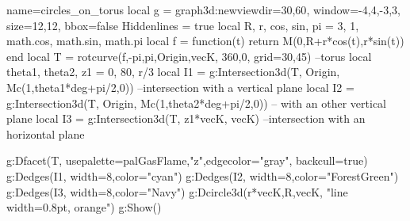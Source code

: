 \documentclass[border=5pt]{standalone}%
\begin{document}
\begin{luadraw}{name=circles_on_torus}
local g = graph3d:new{viewdir={30,60}, window={-4,4,-3,3}, size={12,12}, bbox=false}
Hiddenlines = true
local R, r, cos, sin, pi = 3, 1, math.cos, math.sin, math.pi
local f = function(t) return M(0,R+r*cos(t),r*sin(t)) end
local T = rotcurve(f,-pi,pi,{Origin,vecK}, 360,0, {grid={30,45}}) --torus
local theta1, theta2, z1 = 0, 80, r/3 
local I1 = g:Intersection3d(T, {Origin, Mc(1,theta1*deg+pi/2,0)}) --intersection with a vertical plane
local I2 = g:Intersection3d(T, {Origin, Mc(1,theta2*deg+pi/2,0)}) -- with an other vertical plane
local I3 = g:Intersection3d(T, {z1*vecK, vecK}) --intersection with an horizontal plane

g:Dfacet(T, {usepalette={palGasFlame,"z"},edgecolor="gray", backcull=true})
g:Dedges(I1, {width=8,color="cyan"})
g:Dedges(I2, {width=8,color="ForestGreen"})
g:Dedges(I3, {width=8,color="Navy"})
g:Dcircle3d(r*vecK,R,vecK, "line width=0.8pt, orange")
g:Show()
\end{luadraw}
\end{document}
